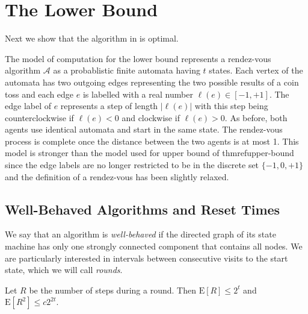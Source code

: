 \documentclass[lotsofwhite]{patmorin}
\newcommand{\E}{\mathrm{E}}
\newcommand{\A}{\mathcal{A}}
\begin{document}
\section{The Lower Bound}

Next we show that the algorithm in  is
optimal.

The model of computation for the lower bound represents a rendez-vous
algorithm $\A$ as a probablistic finite automata having $t$ states.
Each vertex of the automata has two outgoing edges representing the
two possible results of a coin toss and each edge $e$ is labelled with
a real number $\ell(e)\in[-1,+1]$.  The edge label of $e$ represents a
step of length $|\ell(e)|$ with this step being counterclockwise if
$\ell(e)<0$ and clockwise if $\ell(e)>0$.  As before, both agents use
identical automata and start in the same state.  The rendez-vous
process is complete once the distance between the two agents is at
most 1.  This model is stronger than the model used for upper bound of
thmref{upper-bound} since the edge labels are no longer restricted to
be in the discrete set $\{-1,0,+1\}$ and the definition of a
rendez-vous has been slightly relaxed.

\subsection{Well-Behaved Algorithms and Reset Times}

We say that an algorithm is \emph{well-behaved} if the directed graph
of its state machine has only one strongly connected component that
contains all nodes.  We are particularly interested in intervals
between consecutive visits to the start state, which we will call
\emph{rounds}.

\begin{lem}
Let $R$ be the number of steps during a round. Then 
$\E[R] \le 2^t$ and $\E[R^2] \le c2^{2t}$.
\end{lem}
\end{document}

